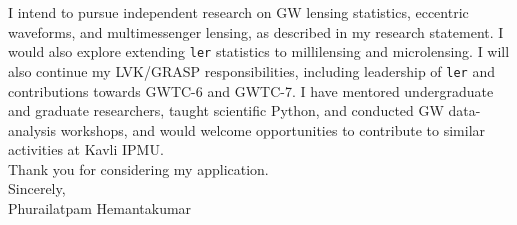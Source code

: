\documentclass[11pt]{article}
\begin{document}
I intend to pursue independent research on GW lensing statistics, eccentric waveforms, and multimessenger lensing, as described in my research statement. I would also explore extending \texttt{ler} statistics to millilensing and microlensing. I will also continue my LVK/GRASP responsibilities, including leadership of \texttt{ler} and contributions towards GWTC-6 and GWTC-7. I have mentored undergraduate and graduate researchers, taught scientific Python, and conducted GW data-analysis workshops, and would welcome opportunities to contribute to similar activities at Kavli IPMU.\\

Thank you for considering my application.\\

Sincerely,\\
Phurailatpam Hemantakumar
\end{document}
